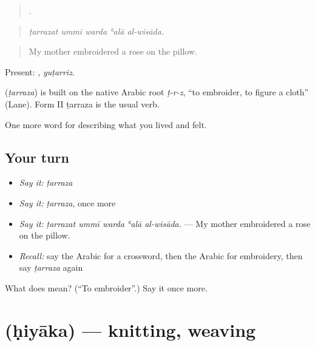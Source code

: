 \begin{quote}
    .
\end{quote}

\begin{quote}
\emph{ṭarrazat ummī warda ʿalā al-wisāda.}
\end{quote}

\begin{quote}
My mother embroidered a rose on the pillow.
\end{quote}

Present: , \emph{yuṭarriz}.

\begin{cousinweb}
\textbf{} (\emph{ṭarraza}) is built on the native Arabic root \emph{ṭ-r-z}, \textquotedblleft{}to embroider, to figure a cloth\textquotedblright{} (Lane). Form II ṭarraza is the usual verb.
\end{cousinweb}

\begin{grammarlens}[title={What you've built}]
One more word for describing what you lived and felt.
\end{grammarlens}

\subsection*{Your turn}
\begin{itemize}
\raggedright
  \item \emph{Say it:} \emph{ṭarraza}
  \item \emph{Say it:} \emph{ṭarraza}, once more
  \item \emph{Say it:} \emph{ṭarrazat ummī warda ʿalā al-wisāda.} — My mother embroidered a rose on the pillow.
  \item \emph{Recall:} say the Arabic for a crossword, then the Arabic for embroidery, then say \emph{ṭarraza} again
\end{itemize}

\begin{tcolorbox}[breakable,colback=teal!4,colframe=teal!35!black,title={Before you move on}]
What does  mean? (\textquotedblleft{}To embroider\textquotedblright{}.) Say it once more.
\end{tcolorbox}
\section[\texorpdfstring{\ar{حياكة} (ḥiyāka)}{حياكة (ḥiyāka)}]{ (ḥiyāka) — knitting, weaving}

